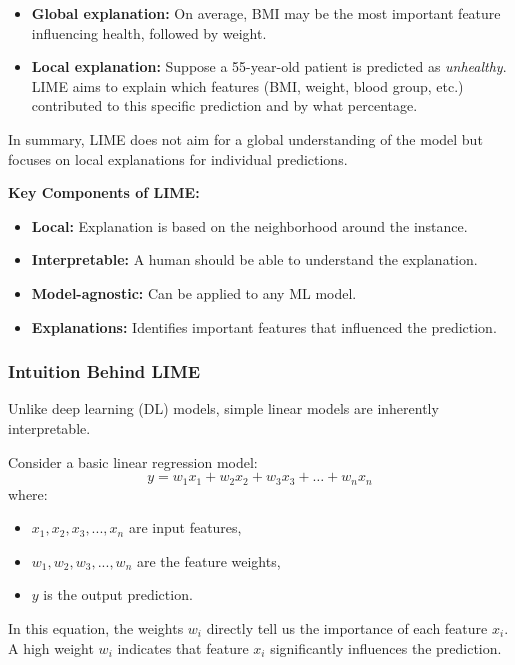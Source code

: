\begin{itemize}
    \item \textbf{Global explanation:} On average, BMI may be the most important feature influencing health, followed by weight.
    \item \textbf{Local explanation:} Suppose a 55-year-old patient is predicted as \textit{unhealthy}. LIME aims to explain which features (BMI, weight, blood group, etc.) contributed to this specific prediction and by what percentage.
\end{itemize}

In summary, LIME does not aim for a global understanding of the model but focuses on local explanations for individual predictions.

\textbf{Key Components of LIME:}
\begin{itemize}
    \item \textbf{Local:} Explanation is based on the neighborhood around the instance.
    \item \textbf{Interpretable:} A human should be able to understand the explanation.
    \item \textbf{Model-agnostic:} Can be applied to any ML model.
    \item \textbf{Explanations:} Identifies important features that influenced the prediction.
\end{itemize}

\subsubsection{Intuition Behind LIME}
Unlike deep learning (DL) models, simple linear models are inherently interpretable. 

Consider a basic linear regression model:
\begin{equation}
    y = w_1x_1 + w_2x_2 + w_3x_3 + \dots + w_nx_n
\end{equation}
where:
\begin{itemize}
    \item \( x_1, x_2, x_3, ..., x_n \) are input features,
    \item \( w_1, w_2, w_3, ..., w_n \) are the feature weights,
    \item \( y \) is the output prediction.
\end{itemize}

In this equation, the weights \( w_i \) directly tell us the importance of each feature \( x_i \). A high weight \( w_i \) indicates that feature \( x_i \) significantly influences the prediction.

